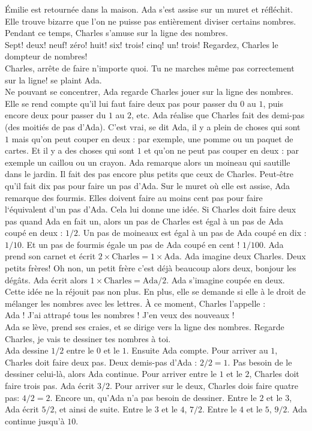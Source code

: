 Émilie est retournée dans la maison. 
Ada s’est assise sur un muret et réfléchit. 
Elle trouve bizarre que l'on ne puisse pas entièrement diviser certains nombres. 
Pendant ce temps, Charles s’amuse sur la ligne des nombres. \\
\guillemotleft Sept! deux! neuf! zéro! huit! six! trois! cinq! un! trois! Regardez, Charles le dompteur de nombres! \\
\mdash Charles, arrête de faire n'importe quoi. Tu ne marches même pas correctement sur la ligne! se plaint Ada. \guillemotright \\
Ne pouvant se concentrer, Ada regarde Charles jouer sur la ligne des nombres. Elle se rend compte qu'il lui faut faire deux pas pour passer du $0$ au $1$, puis encore deux pour passer du $1$ au $2$, etc. Ada réalise que Charles fait des demi-pas (des moitiés de pas d'Ada). 
C’est vrai, se dit Ada, il y a plein de choses qui sont $1$ mais qu’on peut couper en deux : par exemple, une pomme ou un paquet de cartes. Et il y a des choses qui sont $1$ et qu’on ne peut pas couper en deux : par exemple un caillou ou un crayon.
Ada remarque alors un moineau qui sautille dans le jardin. Il fait des pas encore plus petits que ceux de Charles. Peut-être qu'il fait dix pas pour faire un pas d'Ada. Sur le muret où elle est assise, Ada remarque des fourmis. Elles doivent faire au moins cent pas pour faire l‘équivalent d’un pas d'Ada.
Cela lui donne une idée. Si Charles doit faire deux pas quand Ada en fait un, alors un pas de Charles est égal à un pas de Ada coupé en deux : $1/2$. Un pas de moineaux est égal à un pas de Ada coupé en dix : $1/10$. Et un pas de fourmis égale un pas de Ada coupé en cent ! $1/100$.
Ada prend son carnet et écrit $2 \times \mathrm{Charles} = 1 \times \mathrm{Ada}$. Ada imagine deux Charles. Deux petits frères! Oh non, un petit frère c’est déjà beaucoup alors deux, bonjour les dégâts. Ada écrit alors $1 \times \mathrm{Charles} = \mathrm{Ada} / 2$. Ada s’imagine coupée en deux. Cette idée ne la réjouit pas non plus. En plus, elle se demande si elle à le droit de mélanger les nombres avec les lettres.
À ce moment, Charles l’appelle : \\
\guillemotleft Ada ! J’ai attrapé tous les nombres ! J’en veux des nouveaux ! \guillemotright \\
Ada se lève, prend ses craies, et se dirige vers la ligne des nombres.
\guillemotleft Regarde Charles, je vais te dessiner tes nombres à toi. \guillemotright \\
Ada dessine $1/2$ entre le $0$ et le $1$. Ensuite Ada compte. Pour arriver au $1$, Charles doit faire deux pas. Deux demis-pas d’Ada : $2/2 = 1$. Pas besoin de le dessiner celui-là, alors Ada continue. Pour arriver entre le $1$ et le $2$, Charles doit faire trois pas. Ada écrit $3/2$. Pour arriver sur le deux, Charles dois faire quatre pas: $4/2 = 2$. Encore un, qu’Ada n’a pas besoin de dessiner. Entre le $2$ et le $3$, Ada écrit $5/2$, et ainsi de suite. Entre le $3$ et le $4$, $7/2$. Entre le $4$ et le $5$, $9/2$. Ada continue jusqu'à $10$. 
